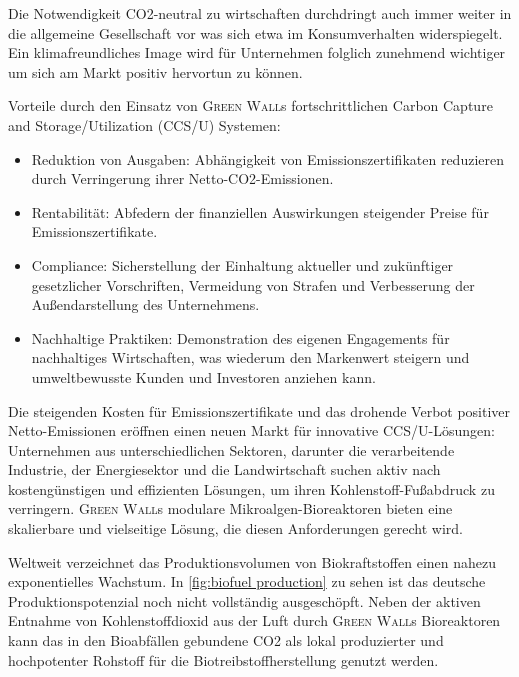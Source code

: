 Die Notwendigkeit CO2-neutral zu wirtschaften durchdringt auch immer weiter in die allgemeine Gesellschaft vor was sich etwa im Konsumverhalten widerspiegelt.
Ein klimafreundliches Image wird für Unternehmen folglich zunehmend wichtiger um sich am Markt positiv hervortun zu können.\par\medskip

Vorteile durch den Einsatz von \textsc{Green Wall}s fortschrittlichen Carbon Capture and Storage/Utilization (CCS/U) Systemen:

\begin{itemize}
    \item Reduktion von Ausgaben: Abhängigkeit von Emissionszertifikaten reduzieren durch Verringerung ihrer Netto-CO2-Emissionen.
    \item Rentabilität: Abfedern der finanziellen Auswirkungen steigender Preise für Emissionszertifikate.
    \item Compliance: Sicherstellung der Einhaltung aktueller und zukünftiger gesetzlicher Vorschriften, Vermeidung von Strafen und Verbesserung der Außendarstellung des Unternehmens.
    \item Nachhaltige Praktiken: Demonstration des eigenen Engagements für nachhaltiges Wirtschaften, was wiederum den Markenwert steigern und umweltbewusste Kunden und Investoren anziehen kann.
\end{itemize}

Die steigenden Kosten für Emissionszertifikate und das drohende Verbot positiver Netto-Emissionen eröffnen einen neuen Markt für innovative CCS/U-Lösungen: Unternehmen aus unterschiedlichen Sektoren, darunter die verarbeitende Industrie, der Energiesektor und die Landwirtschaft suchen aktiv nach kostengünstigen und effizienten Lösungen, um ihren Kohlenstoff-Fußabdruck zu verringern.
\textsc{Green Wall}s modulare Mikroalgen-Bioreaktoren bieten eine skalierbare und vielseitige Lösung, die diesen Anforderungen gerecht wird.\par\medskip

Weltweit verzeichnet das Produktionsvolumen von Biokraftstoffen einen nahezu exponentielles Wachstum.
In \cref{fig:biofuel production} zu sehen ist das deutsche Produktionspotenzial noch nicht vollständig ausgeschöpft. 
Neben der aktiven Entnahme von Kohlenstoffdioxid aus der Luft durch \textsc{Green Wall}s Bioreaktoren kann das in den Bioabfällen gebundene CO2 als lokal produzierter und hochpotenter Rohstoff für die Biotreibstoffherstellung genutzt werden.

